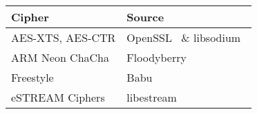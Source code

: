 \begin{table}[t]
    \begin{center}
        \small
        \centering
        \begin{tabular}{l|l}
            \hline
            {\bf Cipher} & {\bf Source} \\
            \hline
            AES-XTS, AES-CTR & OpenSSL~\cite{OpenSSL} \& libsodium~\cite{Sodium}
            \\
            ARM Neon ChaCha & Floodyberry~\cite{Floodyberry} \\
            Freestyle & Babu~\cite{Freestyle} \\
            eSTREAM Ciphers & libestream~\cite{libestream} \\
        \end{tabular}
    \end{center}

\end{table}

